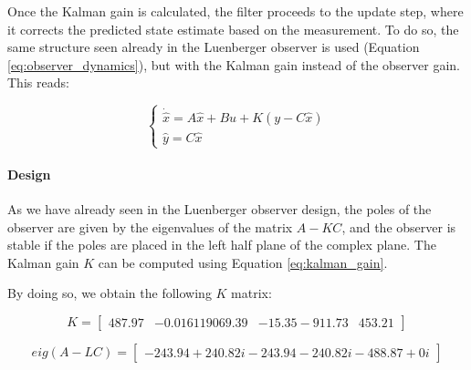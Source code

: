 Once the Kalman gain is calculated, the filter proceeds to the update step, where it corrects the predicted state estimate based on the measurement.
To do so, the same structure seen already in the Luenberger observer is used (Equation \ref{eq:observer_dynamics}), but with the Kalman gain instead of the observer gain.
This reads:

\begin{equation}
    \begin{cases}
        \dot{\hat{x}} = A \hat{x} + B u + K(y - C \hat{x}) \\
        \hat{y} = C \hat{x}
    \end{cases}
\end{equation}


\paragraph{Design}

As we have already seen in the Luenberger observer design, the poles of the observer are given by the eigenvalues of the matrix $A - KC$, and the observer is stable if the poles are placed in the left half plane of the complex plane.
The Kalman gain $K$ can be computed using Equation \ref{eq:kalman_gain}.

By doing so, we obtain the following $K$ matrix:

\begin{equation}
    K = \begin{bmatrix}
        487.97    & -0.016
        119069.39 & -15.35
        -911.73   & 453.21
    \end{bmatrix}
    \label{eq:kalman_gain_matrix}
\end{equation}

\begin{equation}
    eig(A - L C) =
    \begin{bmatrix}
        -243.94 + 240.82i
        -243.94 - 240.82i
        -488.87 + 0i
    \end{bmatrix}
    \label{eq:K_kalman}
\end{equation}


